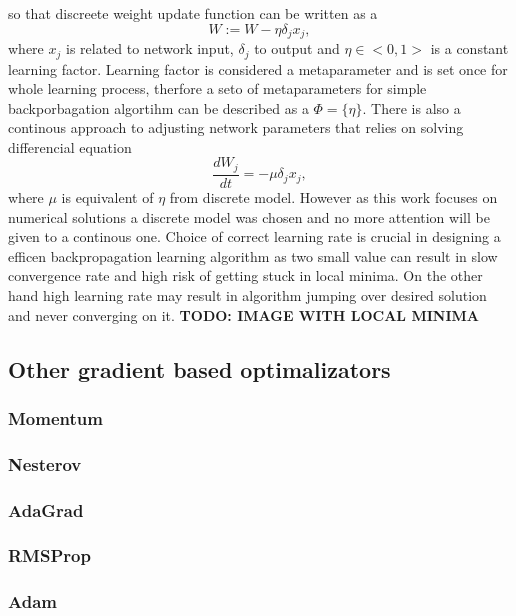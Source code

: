 so that discreete weight update function can be written as a 
\begin{equation}
	W := W - \eta \delta_{j} x_{j},
\end{equation}
where $x_{j}$ is related to network input,  $\delta_{j}$ to output and $\eta \in <0,1>$ is a 
constant learning factor.
Learning factor is considered a metaparameter and is set once for whole learning process, 
therfore a seto of metaparameters for simple backporbagation algortihm can be described as 
a $\Phi = \{\eta \}$. There is also a continous approach to adjusting network parameters that
relies on solving differencial equation
\begin{equation}
	\frac{dW_{j}}{dt} = -\mu \delta_{j} x_{j},
\end{equation}
where $\mu$ is equivalent of $\eta$ from discrete model. However as this work focuses on 
numerical solutions a discrete model was chosen and no more attention will be given to a 
continous one.
Choice of correct learning rate is crucial in designing a efficen backpropagation 
learning algorithm as two small value can result in slow convergence rate and high risk of 
getting stuck in local minima. On the other hand high learning rate may result in algorithm
jumping over desired solution and never converging on it. \textbf{TODO: IMAGE WITH LOCAL MINIMA}

\subsection{Other gradient based optimalizators}
\subsubsection{Momentum}
\subsubsection{Nesterov}
\subsubsection{AdaGrad}
\subsubsection{RMSProp}
\subsubsection{Adam}

